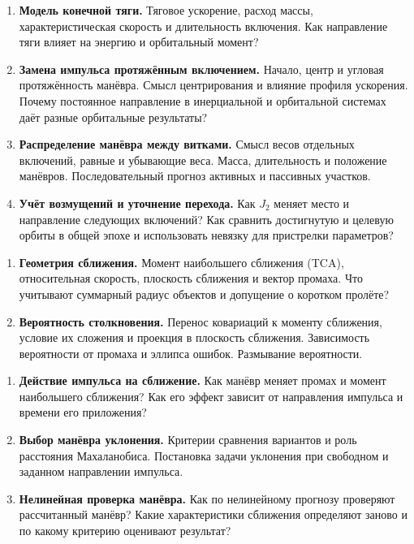 \documentclass[11pt,a4paper]{article}
\begin{document}
\begin{enumerate}[resume=topics]
\item \textbf{Модель конечной тяги.} Тяговое ускорение, расход массы,
характеристическая скорость и длительность включения. Как направление
тяги влияет на энергию и орбитальный момент?
\item \textbf{Замена импульса протяжённым включением.} Начало, центр и угловая
протяжённость манёвра. Смысл центрирования и влияние профиля ускорения.
Почему постоянное направление в инерциальной и орбитальной системах
даёт разные орбитальные результаты?
\item \textbf{Распределение манёвра между витками.} Смысл весов отдельных
включений, равные и убывающие веса. Масса, длительность и положение
манёвров. Последовательный прогноз активных и пассивных участков.
\item \textbf{Учёт возмущений и уточнение перехода.} Как $J_2$ меняет место
и направление следующих включений? Как сравнить достигнутую и целевую
орбиты в общей эпохе и использовать невязку для пристрелки параметров?
\end{enumerate}

\begin{enumerate}[resume=topics]
\item \textbf{Геометрия сближения.} Момент наибольшего сближения (TCA),
относительная скорость, плоскость сближения и вектор промаха. Что учитывают
суммарный радиус объектов и допущение о коротком пролёте?
\item \textbf{Вероятность столкновения.} Перенос ковариаций к моменту сближения,
условие их сложения и проекция в плоскость сближения. Зависимость вероятности
от промаха и эллипса ошибок. Размывание вероятности.
\end{enumerate}

\newpage
{}
\begin{enumerate}[resume=topics]
\item \textbf{Действие импульса на сближение.} Как манёвр меняет промах
и момент наибольшего сближения? Как его эффект зависит от направления
импульса и времени его приложения?
\item \textbf{Выбор манёвра уклонения.} Критерии сравнения вариантов и роль
расстояния Махаланобиса. Постановка задачи уклонения при свободном и заданном
направлении импульса.
\item \textbf{Нелинейная проверка манёвра.} Как по нелинейному прогнозу
проверяют рассчитанный манёвр? Какие характеристики сближения определяют
заново и по какому критерию оценивают результат?
\end{enumerate}
\end{document}
